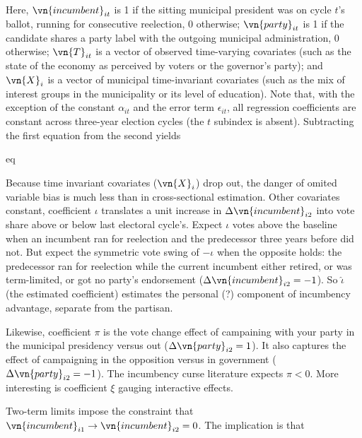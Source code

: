 \noindent Here, $\vn{incumbent}_{it}$ is 1 if the sitting municipal president was on cycle $t$'s ballot, running for consecutive reelection, 0 otherwise; $\vn{party}_{it}$ is 1 if the candidate shares a party label with the outgoing municipal administration, 0 otherwise; $\vn{T}_{it}$ is a vector of observed time-varying covariates (such as the state of the economy as perceived by voters or the governor's party); and $\vn{X}_i$ is a vector of municipal time-invariant covariates (such as the mix of interest groups in the municipality or its level of education). Note that, with the exception of the constant $\alpha_{it}$ and the error term $\epsilon_{it}$, all regression coefficients are constant across three-year election cycles (the $t$ subindex is absent). Subtracting the first equation from the second yields

eq

\noindent Because time invariant covariates ($\vn{X}_i$) drop out, the danger of omited variable bias is much less than in cross-sectional estimation. Other covariates constant, coefficient $\iota$ translates a unit increase in $\Delta \vn{incumbent}_{i2}$ into vote share above or below last electoral cycle's. Expect $\iota$ votes above the baseline when an incumbent ran for reelection and the predecessor three years before did not. But expect the symmetric vote swing of $-\iota$ when the opposite holds: the predecessor ran for reelection while the current incumbent either retired, or was term-limited, or got no party's endorsement ($\Delta \vn{incumbent}_{i2}=-1$). So $\hat{\iota}$ (the estimated coefficient) estimates the personal (?) component of incumbency advantage, separate from the partisan.

Likewise, coefficient $\pi$ is the vote change effect of campaining with your party in the municipal presidency versus out ($\Delta \vn{party}_{i2}=1$). It also captures the effect of campaigning in the opposition versus in government ($\Delta \vn{party}_{i2}=-1$). The incumbency curse literature \citep{lucardi.rosas.Incumbency.2016,folkle.snyderGubMidtermSlump.2012} expects $\pi < 0$. More interesting is coefficient $\xi$ gauging interactive effects.  


Two-term limits impose the constraint that $\vn{incumbent}_{i1} \rightarrow \vn{incumbent}_{i2}=0$. The implication is that 
